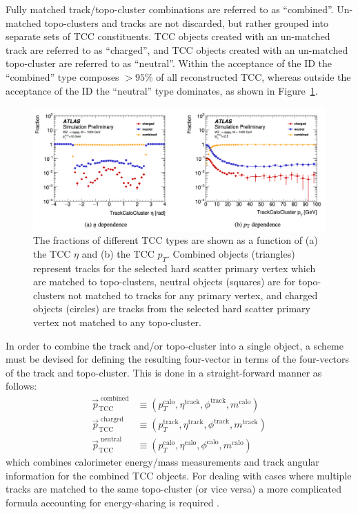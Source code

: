 Fully matched track/topo-cluster combinations are referred to as ``combined''.
Un-matched topo-clusters and tracks are not discarded, but rather grouped into separate sets of TCC constituents.
TCC objects created with an un-matched track are referred to as ``charged'', and TCC objects created with an un-matched topo-cluster are referred to as ``neutral''.
Within the acceptance of the ID the ``combined'' type composes $> 95\%$ of all reconstructed TCC, whereas outside the acceptance of the ID the ``neutral'' type dominates, as shown in Figure~\ref{fig:tcc_cluster_fractions}.

\begin{figure}
	\centering
	\includegraphics[width=\textwidth]{tcc_cluster_fractions}
	\caption{
	The fractions of different TCC types are shown as a function  of (a) the TCC $\eta$ and (b) the TCC $p_T$.
	Combined objects (triangles) represent tracks for the selected hard scatter primary vertex which are matched to topo-clusters, neutral objects (squares) are for topo-clusters not matched to tracks for any primary vertex, and charged objects (circles) are tracks from the selected hard scatter primary vertex not matched to any topo-cluster.
    \cite{ATL-PHYS-PUB-2017-015}
	}
	\label{fig:tcc_cluster_fractions}
\end{figure}

In order to combine the track and/or topo-cluster into a single object, a scheme must be devised for defining the resulting four-vector in terms of the four-vectors of the track and topo-cluster.
This is done in a straight-forward manner as follows:
\newcommand*\caloP[1]{#1^{\mathrm{calo}}}
\newcommand*\trackP[1]{#1^{\mathrm{track}}}
\begin{align}
    \vec{p}_{\mathrm{TCC}}^{\mathrm{\;combined}} &\equiv (\caloP{p_T}, \trackP{\eta}, \trackP{\phi}, \caloP{m})\\
    \vec{p}_{\mathrm{TCC}}^{\mathrm{\;charged}} &\equiv (\trackP{p_T}, \trackP{\eta}, \trackP{\phi}, \trackP{m})\\
    \vec{p}_{\mathrm{TCC}}^{\mathrm{\;neutral}} &\equiv (\caloP{p_T}, \caloP{\eta}, \caloP{\phi}, \caloP{m})
\end{align}
which combines calorimeter energy/mass measurements and track angular information for the combined TCC objects.
For dealing with cases where multiple tracks are matched to the same topo-cluster (or vice versa) a more complicated formula accounting for energy-sharing is required \cite{ATL-PHYS-PUB-2017-015}. 

